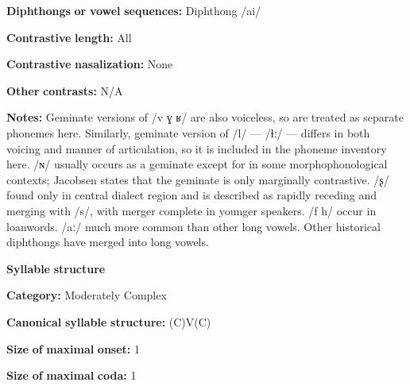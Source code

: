 \documentclass[output=paper]{langsci/langscibook}
\begin{document}
\begin{styleBody}
\textbf{Diphthongs} \textbf{or} \textbf{vowel} \textbf{sequences:} Diphthong /ai/
\end{styleBody}

\begin{styleBody}
\textbf{Contrastive} \textbf{length:} All
\end{styleBody}

\begin{styleBody}
\textbf{Contrastive} \textbf{nasalization:} None
\end{styleBody}

\begin{styleBody}
\textbf{Other} \textbf{contrasts:} N/A
\end{styleBody}

\begin{styleBody}
\textbf{Notes:} Geminate versions of /v ɣ ʁ/ are also voiceless, so are treated as separate phonemes here. Similarly, geminate version of /l/ — /ɬː/ — differs in both voicing and manner of articulation, so it is included in the phoneme inventory here. /ɴ/ usually occurs as a geminate except for in some morphophonological contexts; Jacobsen states that the geminate is only marginally contrastive. /ʂ/ found only in central dialect region and is described as rapidly receding and merging with /s/, with merger complete in younger speakers. /f h/ occur in loanwords. /aː/ much more common than other long vowels. Other historical diphthongs have merged into long vowels.
\end{styleBody}

\begin{styleBody}
\textbf{Syllable} \textbf{structure}
\end{styleBody}

\begin{styleBody}
\textbf{Category:} Moderately Complex
\end{styleBody}

\begin{styleBody}
\textbf{Canonical} \textbf{syllable} \textbf{structure:} (C)V(C) \citep[338-9]{Fortescue1984}
\end{styleBody}

\begin{styleBody}
\textbf{Size} \textbf{of} \textbf{maximal} \textbf{onset:} 1
\end{styleBody}

\begin{styleBody}
\textbf{Size} \textbf{of} \textbf{maximal} \textbf{coda:} 1
\end{styleBody}
\end{document}

